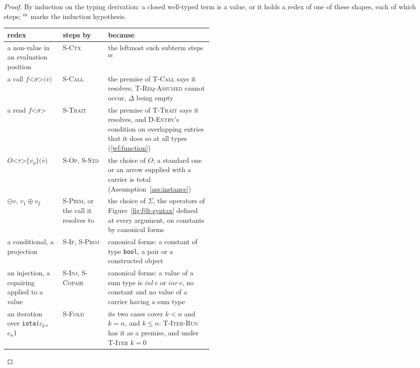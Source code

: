 \begin{proof}
By induction on the typing derivation: a closed well-typed term is a value, or it holds a redex of one of these shapes, each of which steps; ${}^{\textsc{ih}}$ marks the induction hypothesis.
\begingroup
\small
\begin{longtable}{@{}>{\raggedright\arraybackslash}p{0.27\linewidth}>{\raggedright\arraybackslash}p{0.22\linewidth}>{\raggedright\arraybackslash}p{}@{}}
\toprule
redex & steps by & because \\
\midrule
\endhead
\bottomrule
\endlastfoot
a non-value in an evaluation position & \textsc{S-Ctx} & the leftmost such subterm steps${}^{\textsc{ih}}$ \\
a call $f\texttt{<}\overline{\sigma}\texttt{>(}\overline{v}\texttt{)}$ & \textsc{S-Call} & the premise of \textsc{T-Call} says it resolves; \textsc{T-Req-Assumed} cannot occur, $\Delta$ being empty \\
a read $f\texttt{<}\overline{\sigma}\texttt{>}$ & \textsc{S-Trait} & the premise of \textsc{T-Trait} says it resolves, and \textsc{D-Entry}'s condition on overlapping entries that it does so at all types (\ref{wf:function}) \\
$O\texttt{<}\overline{\tau}\texttt{>\{}\overline{v_y}\texttt{\}(}\overline{v}\texttt{)}$ & \textsc{S-Op}, \textsc{S-Std} & the choice of $O$; a standard one or an arrow supplied with a carrier is total (Assumption~\ref{ass:instance}) \\
$\ominus v$, $v_1 \oplus v_2$ & \textsc{S-Prim}, or the call it resolves to & the choice of $\Sigma$, the operators of Figure~\ref{fig:fjlt-syntax} defined at every argument, on constants by canonical forms \\
a conditional, a projection & \textsc{S-If}, \textsc{S-Proj} & canonical forms: a constant of type \texttt{bool}, a pair or a constructed object \\
an injection, a copairing applied to a value & \textsc{S-Inj}, \textsc{S-Copair} & canonical forms: a value of a sum type is $\mathit{inl}\,v$ or $\mathit{inr}\,v$, no constant and no value of a carrier having a sum type \\
an iteration over \texttt{iota(}$c_k$\texttt{, }$c_n$\texttt{)} & \textsc{S-Fold} & its two cases cover $k < n$ and $k = n$, and $k \le n$: \textsc{T-Iter-Run} has it as a premise, and under \textsc{T-Iter} $k = 0$ \\
\end{longtable}
\addtocounter{table}{-1}
\endgroup
\end{proof}

